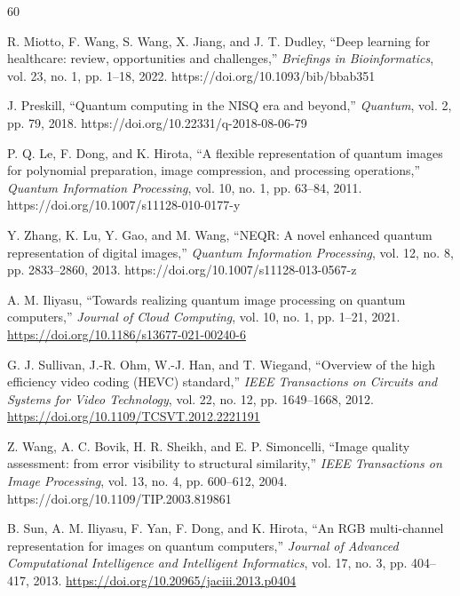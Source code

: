 \documentclass[11pt,a4paper]{article}
\begin{document}
\begin{thebibliography}{60}

R. Miotto, F. Wang, S. Wang, X. Jiang, and J. T. Dudley, ``Deep learning for healthcare: review, opportunities and challenges,'' \textit{Briefings in Bioinformatics}, vol. 23, no. 1, pp. 1--18, 2022. https://doi.org/10.1093/bib/bbab351

J. Preskill, ``Quantum computing in the NISQ era and beyond,'' \textit{Quantum}, vol. 2, pp. 79, 2018. https://doi.org/10.22331/q-2018-08-06-79

P. Q. Le, F. Dong, and K. Hirota, ``A flexible representation of quantum images for polynomial preparation, image compression, and processing operations,'' \textit{Quantum Information Processing}, vol. 10, no. 1, pp. 63--84, 2011. https://doi.org/10.1007/s11128-010-0177-y

Y. Zhang, K. Lu, Y. Gao, and M. Wang, ``NEQR: A novel enhanced quantum representation of digital images,'' \textit{Quantum Information Processing}, vol. 12, no. 8, pp. 2833--2860, 2013. https://doi.org/10.1007/s11128-013-0567-z

A. M. Iliyasu, ``Towards realizing quantum image processing on quantum computers,'' \textit{Journal of Cloud Computing}, vol. 10, no. 1, pp. 1--21, 2021. \url{https://doi.org/10.1186/s13677-021-00240-6}

G. J. Sullivan, J.-R. Ohm, W.-J. Han, and T. Wiegand, ``Overview of the high efficiency video coding (HEVC) standard,'' \textit{IEEE Transactions on Circuits and Systems for Video Technology}, vol. 22, no. 12, pp. 1649--1668, 2012. \url{https://doi.org/10.1109/TCSVT.2012.2221191}

Z. Wang, A. C. Bovik, H. R. Sheikh, and E. P. Simoncelli, ``Image quality assessment: from error visibility to structural similarity,'' \textit{IEEE Transactions on Image Processing}, vol. 13, no. 4, pp. 600--612, 2004. https://doi.org/10.1109/TIP.2003.819861

B. Sun, A. M. Iliyasu, F. Yan, F. Dong, and K. Hirota, ``An RGB multi-channel representation for images on quantum computers,'' \textit{Journal of Advanced Computational Intelligence and Intelligent Informatics}, vol. 17, no. 3, pp. 404--417, 2013. \url{https://doi.org/10.20965/jaciii.2013.p0404}


\end{thebibliography}
\end{document}
